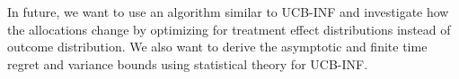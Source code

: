 \documentclass[12pt, letterpaper]{article}
\begin{document}
In future, we want to use an algorithm similar to UCB-INF and investigate how the allocations change by optimizing for treatment effect distributions instead of outcome distribution. We also want to derive the asymptotic and finite time regret and variance bounds using statistical theory for UCB-INF.

\newpage

\end{document}
